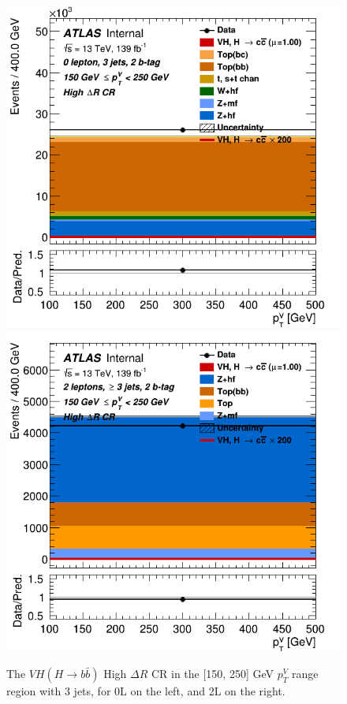 \begin{figure}[h!]
\center
\includegraphics[scale=0.325]{Images/VH/SRsandTopCRs/Region_distpTV_DCRHigh_BMax250_L0_Y6051_TTypebb_T2_J3_BMin150_Prefit.png}
\includegraphics[scale=0.325]{Images/VH/SRsandTopCRs/Region_distpTV_DCRHigh_BMax250_BMin150_Y6051_TTypebb_T2_J3_L2_incJet1_Prefit.png}
\caption{The $VH(H\rightarrow b\bar{b})$ High $\Delta R$ CR in the [150, 250] GeV $p_T^V$ range region with 3 jets, for 0L on the left, and 2L on the right.} 
\label{fig:vhbbDRCR02L}
\end{figure}

